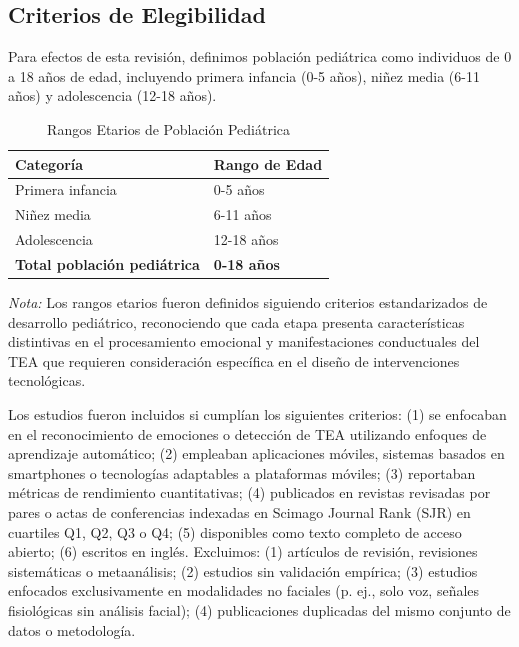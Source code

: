 \documentclass{ieeeaccess}
\begin{document}
	\subsection{Criterios de Elegibilidad}
	Para efectos de esta revisión, definimos población pediátrica como individuos de 0 a 18 años de edad, incluyendo primera infancia (0-5 años), niñez media (6-11 años) y adolescencia (12-18 años).
	
	\begin{table}[h]
		\centering
		\caption{Rangos Etarios de Población Pediátrica}
		\label{tab:rangos}
		\begin{tabular}{|l|l|}
			\hline
			\textbf{Categoría} & \textbf{Rango de Edad} \\
			\hline
			Primera infancia & 0-5 años \\
			Niñez media & 6-11 años \\
			Adolescencia & 12-18 años \\
			\hline
			\textbf{Total población pediátrica} & \textbf{0-18 años} \\
			\hline
		\end{tabular}
		\begin{flushleft}
			\small \textit{Nota:} Los rangos etarios fueron definidos siguiendo criterios estandarizados de desarrollo pediátrico, reconociendo que cada etapa presenta características distintivas en el procesamiento emocional y manifestaciones conductuales del TEA que requieren consideración específica en el diseño de intervenciones tecnológicas.
		\end{flushleft}
	\end{table}
	
	Los estudios fueron incluidos si cumplían los siguientes criterios: (1) se enfocaban en el reconocimiento de emociones o detección de TEA utilizando enfoques de aprendizaje automático; (2) empleaban aplicaciones móviles, sistemas basados en smartphones o tecnologías adaptables a plataformas móviles; (3) reportaban métricas de rendimiento cuantitativas; (4) publicados en revistas revisadas por pares o actas de conferencias indexadas en Scimago Journal Rank (SJR) en cuartiles Q1, Q2, Q3 o Q4; (5) disponibles como texto completo de acceso abierto; (6) escritos en inglés. Excluimos: (1) artículos de revisión, revisiones sistemáticas o metaanálisis; (2) estudios sin validación empírica; (3) estudios enfocados exclusivamente en modalidades no faciales (p. ej., solo voz, señales fisiológicas sin análisis facial); (4) publicaciones duplicadas del mismo conjunto de datos o metodología.
	
\end{document}
